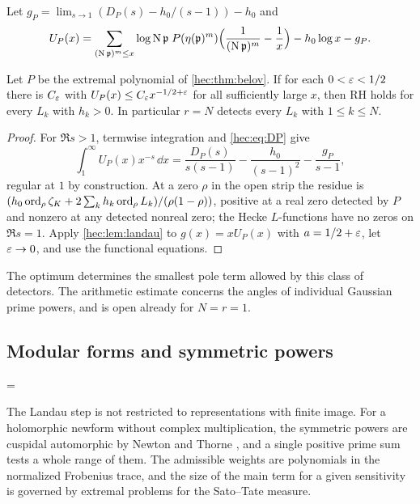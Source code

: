 Let $g_P=\lim_{s\to1}(D_P(s)-h_0/(s-1))-h_0$ and
\[
 U_P(x)=\sum_{(\operatorname{N}\mathfrak p)^m\le x}\log\operatorname{N}\mathfrak p\;P(\eta(\mathfrak p)^m)
 \Bigl(\frac1{(\operatorname{N}\mathfrak p)^m}-\frac1x\Bigr)-h_0\log x-g_P .
\]

\begin{theorem}\label{hec:thm:angular}
Let $P$ be the extremal polynomial of \cref{hec:thm:belov}. If for each $0<\varepsilon<1/2$ there is $C_\varepsilon$ with
$U_P(x)\le C_\varepsilon x^{-1/2+\varepsilon}$ for all sufficiently large $x$, then RH holds for every $L_k$ with
$h_k>0$. In particular $r=N$ detects every $L_k$ with $1\le k\le N$.
\end{theorem}

\begin{proof}
For $\Re s>1$, termwise integration and \eqref{hec:eq:DP} give
\[
 \int_1^\infty U_P(x)x^{-s}\,\dd x=\frac{D_P(s)}{s(s-1)}-\frac{h_0}{(s-1)^2}-\frac{g_P}{s-1},
\]
regular at $1$ by construction. At a zero $\rho$ in the open strip the residue is
$(h_0\operatorname{ord}_\rho\zeta_K+2\sum_kh_k\operatorname{ord}_\rho L_k)/(\rho(1-\rho))$, positive at a real zero detected by $P$
and nonzero at any detected nonreal zero; the Hecke $L$-functions have no zeros on $\Re s=1$. Apply
\cref{hec:lem:landau} to $g(x)=xU_P(x)$ with $a=1/2+\varepsilon$, let $\varepsilon\to0$, and use the functional
equations.
\end{proof}

The optimum determines the smallest pole term allowed by this class of detectors. The arithmetic estimate
concerns the angles of individual Gaussian prime powers, and is open already for $N=r=1$.

\subsection{Modular forms and symmetric powers}\label{hec:ss:sym}
{\emergencystretch=\textwidth{}}

The Landau step is not restricted to representations with finite image. For a holomorphic newform
without complex multiplication, the symmetric powers are cuspidal automorphic by Newton and Thorne
\cite{NewtonThorne2021Symmetric}, and a single positive prime sum tests a whole range of them. The
admissible weights are polynomials in the normalized Frobenius trace, and the size of the main term for a
given sensitivity is governed by extremal problems for the Sato--Tate measure.

